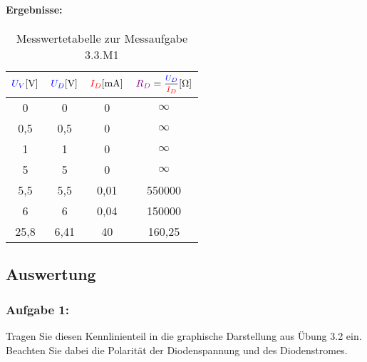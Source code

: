 \documentclass[11pt,a4paper,titlepage]{scrreprt}
\begin{document}
              \paragraph{Ergebnisse:}
                  \begin{center}
                      \begin{table}[!hbtp]
                          \caption{Messwertetabelle zur Messaufgabe 3.3.M1}
                          \label{tbl:messergebnisse3.3}
                          \renewcommand{\arraystretch}{1.3}
                          \begin{center}

                              \begin{tabular}{cccc}
                                  $\textcolor{blue}{U_V} [\si{\volt}]$ &
                                  $\textcolor{blue}{U_D}[\si{\volt}]$ &
                                  $\textcolor{red}{I_D} [\si{\milli\ampere}]$ &
                                  $\widerstand{R_D} = \mfrac{\spannung{U_D}}{\strom{I_D}} [\si{\ohm}]$ \\ \hline

                                  0 & 0 & 0 & $\infty$\\
                                  0,5 & 0,5 & 0 & $\infty$\\
                                  1 & 1 & 0 & $\infty$\\
                                  5 & 5 & 0 & $\infty$\\
                                  5,5 & 5,5 & 0,01 & 550000\\
                                  6 & 6 & 0,04 & 150000\\
                                  25,8 & 6,41 & 40 & 160,25\\
                              \end{tabular}
                          \end{center}
                      \end{table}
                  \end{center}

         \subsection{Auswertung}
            \subsubsection{Aufgabe 1:} Tragen Sie diesen Kennlinienteil in die graphische Darstellung aus Übung 3.2 ein. Beachten Sie dabei die Polarität der Diodenspannung und des Diodenstromes.
\end{document}
